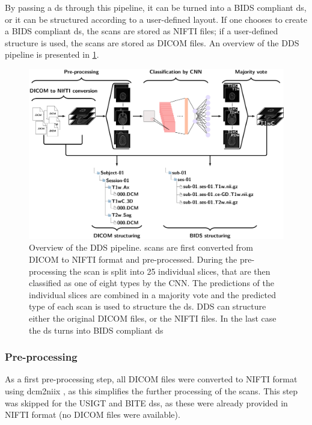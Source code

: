 By passing a \gls{ds} through this pipeline, it can be turned into a \gls{BIDS} compliant \gls{ds}, or it can be structured according to a user-defined layout.
If one chooses to create a \gls{BIDS} compliant \gls{ds}, the \glspl{scan} are stored as \gls{NIFTI} files; if a user-defined structure is used, the \glspl{scan} are stored as \gls{DICOM} files.
An overview of the \gls{DDS} pipeline is presented in \cref{fig:DDS_pipeline}.

\begin{figure}
\centering

\includegraphics[width=\textwidth]{Figures/DDS_pipeline.pdf}
\caption{Overview of the \gls{DDS} pipeline.
\Glspl{scan} are first converted from \gls{DICOM} to \gls{NIFTI} format and pre-processed.
During the pre-processing the \gls{scan} is split into \num{25} individual \glspl{slice}, that are then classified as one of eight \glspl{type} by the \gls{CNN}.
The predictions of the individual \glspl{slice} are combined in a majority vote and the predicted \gls{type} of each \gls{scan} is used to structure the \gls{ds}.
\gls{DDS} can structure either the original \gls{DICOM} files, or the \gls{NIFTI} files.
In the last case the \gls{ds} turns into \gls{BIDS} compliant \gls{ds}}
\label{fig:DDS_pipeline}

\end{figure}

\subsubsection{Pre-processing}
\label{sec:preprocessing}
As a first pre-processing step, all \gls{DICOM} files were converted to \gls{NIFTI} format using dcm2niix \autocite{li2016first}, as this simplifies the further processing of the \glspl{scan}.
This step was skipped for the \gls{USIGT} and \gls{BITE} \glspl{ds}, as these were already provided in \gls{NIFTI} format (no \gls{DICOM} files were available).

